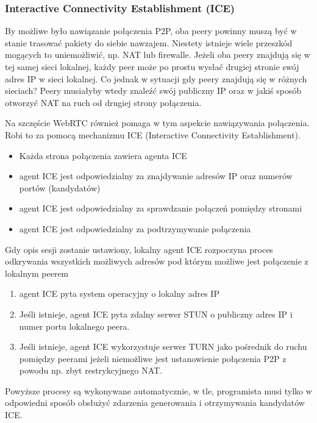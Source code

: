 \subsubsection{Interactive Connectivity Establishment (ICE)}
\label{ice}

By możliwe było nawiązanie połączenia P2P, oba peery powinny muszą być w stanie trasować pakiety do
siebie nawzajem. Niestety istnieje wiele przeszkód mogących to uniemożliwić, np. NAT lub firewalle.
Jeżeli oba peery znajdują się w tej samej sieci lokalnej, każdy peer może po prostu wysłać drugiej
stronie swój adres IP w sieci lokalnej. Co jednak w sytuacji gdy peery znajdują się w różnych
sieciach? Peery musiałyby wtedy znaleźć swój publiczny IP oraz w jakiś sposób otworzyć NAT na ruch
od drugiej strony połączenia.

Na szczęście WebRTC również pomaga w tym aspekcie nawiązywania połączenia. Robi to za pomocą
mechanizmu ICE (Interactive Connectivity Establishment).

\begin{itemize}
    \item Każda strona połączenia zawiera agenta ICE
    \item agent ICE jest odpowiedzialny za znajdywanie adresów IP oraz numerów portów (kandydatów)
    \item agent ICE jest odpowiedzialny za sprawdzanie połączeń pomiędzy stronami
    \item agent ICE jest odpowiedzialny za podtrzymywanie połączenia
\end{itemize}

Gdy opis sesji zostanie ustawiony, lokalny agent ICE rozpoczyna proces odkrywania wszystkich
możliwych adresów pod którym możliwe jest połączenie z lokalnym peerem

\begin{enumerate}
    \item agent ICE pyta system operacyjny o lokalny adres IP
    \item Jeśli istnieje, agent ICE pyta zdalny serwer STUN o publiczny adres IP i numer portu
          lokalnego peera.
    \item Jeśli istnieje, agent ICE wykorzystuje serwer TURN jako pośrednik do ruchu pomiędzy
          peerami jeżeli niemożliwe jest ustanowienie połączenia P2P z powodu np. zbyt restrykcyjnego NAT.
\end{enumerate}

Powyższe procesy są wykonywane automatycznie, w tle, programista musi tylko w odpowiedni sposób
obsłużyć zdarzenia generowania i otrzymywania kandydatów ICE.

